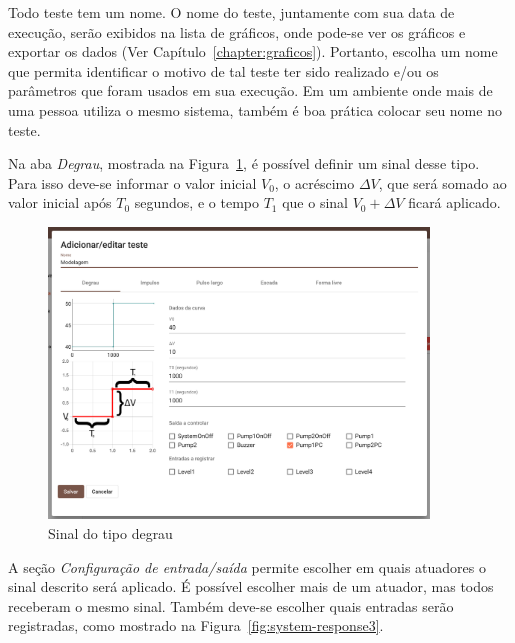 Todo teste tem um nome. O nome do teste, juntamente com sua data de execução,
serão exibidos na lista de gráficos, onde pode-se ver os gráficos e exportar os
dados (Ver Capítulo~\ref{chapter:graficos}). Portanto, escolha um nome que
permita identificar o motivo de tal teste ter sido realizado e/ou os parâmetros
que foram usados em sua execução. Em um ambiente onde mais de uma pessoa utiliza
o mesmo sistema, também é boa prática colocar seu nome no teste.

Na aba \textit{Degrau}, mostrada na Figura~\ref{fig:system-response2}, é
possível definir um sinal desse tipo. Para isso deve-se informar o valor inicial
\textit{\(V_0\)}, o acréscimo \textit{\(\Delta{}V\)}, que será somado ao valor
inicial após \textit{\(T_0\)} segundos, e o tempo \textit{\(T_1\)} que o sinal
\textit{\(V_0 + \Delta{}V\)} ficará aplicado.

\begin{figure}[ht!]
    \centering
    \includegraphics[width=0.9\textwidth]{imgs/system-response2}
    \caption[Sinal do tipo degrau]{Sinal do tipo degrau}%
    \label{fig:system-response2}
\end{figure}

A seção \textit{Configuração de entrada/saída} permite escolher em quais
atuadores o sinal descrito será aplicado. É possível escolher mais de um
atuador, mas todos receberam o mesmo sinal. Também deve-se escolher quais
entradas serão registradas, como mostrado na Figura~\ref{fig:system-response3}.

